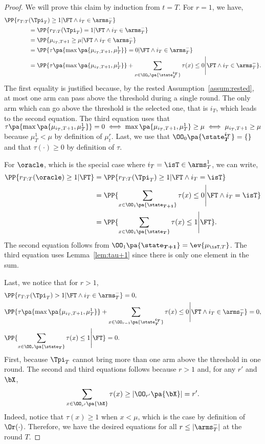 \begin{proof}
We will prove this claim by induction from $t=T$. For $r=1$, we have,
\begin{align*}
&\PP{r_{T:T}(\Tpi_{T}) \geq 1| \FT \land i_T \in \arms_T^-} \\
&\qquad\qquad= \PP{r_{T:T}(\Tpi_{T}) = 1| \FT\land i_T \in \arms_T^-} \\
&\qquad\qquad= \PP{\mu_{i_T,T+1} \geq \mu | \FT \land i_T \in \arms_T^-} \\
&\qquad\qquad= \PP{\tau\pa{\max\pa{\mu_{i_T,T+1}, \mu^1_{T}}} = 0  | \FT \land i_T \in \arms_T^-} \\
&\qquad\qquad= \PP{ \tau\pa{\max\pa{\mu_{i_T,T+1}, \mu^1_{T}}} + \sum_{x \in \OO_{0}\pa{\state_{\boldsymbol{T}}^{\boldsymbol{i_T}}}} \tau(x)\leq 0 \Bigg | \FT \land i_T \in \arms_T^-}. 
\end{align*}
The first equality is justified because, by the rested Assumption~\ref{assum:rested}, at most one arm can pass above the threshold during a single round. The only arm which can go above the threshold is the selected one, that is $i_T$, which leads to the second equation. The third equation uses that $\tau\pa{\max\pa{\mu_{i_T,T+1}, \mu^1_{T}}}=0 \iff \max\pa{\mu_{i_T,T+1}, \mu^1_{T}}\geq \mu \iff \mu_{i_T,T+1} \geq \mu$ because $\mu^1_{T} < \mu$ by definition of $\mu^r_t$.  Last, we use that $\OO_{0}\pa{\state_{\boldsymbol{T}}^{\boldsymbol{i_T}}}  = \left\{ \right\}$ and that $\tau(\cdot) \geq 0$ by definition of $\tau$.

For $\oracle$, which is the special case where $i_T = \isT \in \arms^1_T$, we can write,
\begin{align*}
\PP{r_{T:T}(\oracle) \geq 1| \FT }& = \PP{r_{T:T}(\Tpi_{T}) \geq 1| \FT \land i_T = \isT} \\
&=  \PP{\sum_{x \in \OO_{1}\pa{\state_{\boldsymbol{T+1}}}} \tau(x)\leq 0 \Bigg | \FT \land i_T=\isT} \\
& = \PP{\sum_{x \in \OO_{1}\pa{\state_{\boldsymbol{T}}}} \tau(x)\leq 1 \Bigg | \FT }. 
\end{align*}
The second equation follows from $\OO_{1}\pa{\state_{\boldsymbol{T+1}}} = \ev{\mu_{\isT,T}}$. The third equation uses Lemma~\ref{lem:tau+1} since there is only one element in the sum. 

Last, we notice that for $r>1$, 
\begin{align*}
&\PP{r_{T:T}(\Tpi_{T}) > 1| \FT \land i_T \in \arms_T^-} = 0,\\
& \PP{ \tau\pa{\max\pa{\mu_{i_T,T+1}, \mu^1_{T}}} + \sum_{x \in \OO_{r-1}\pa{\state_{\boldsymbol{T}}^{\boldsymbol{i_T}}}} \tau(x)\leq 0 \Bigg | \FT \land i_T \in \arms_T^-} =0,\\
 &\PP{\sum_{x \in \OO_{r}\pa{\state_{\boldsymbol{T}}}} \tau(x)\leq 1 \Bigg | \FT }=0.
\end{align*}
First, because $\Tpi_T$ cannot bring more than one arm above the threshold in one round. The second and third equations follows because $r>1$ and, for any $r'$ and $\bX$,
\[\sum_{x \in \OO_{r'}\pa{\bX}} \tau(x) \geq | \OO_{r'}\pa{\bX}| = r' .\] 
 Indeed, notice that $\tau(x) \geq 1$ when $x<\mu$, which is the case by definition of $\Or(\cdot)$. Therefore, we have the desired equations for all $r\leq | \arms^-_T|$ at the round $T$.



\end{proof}
